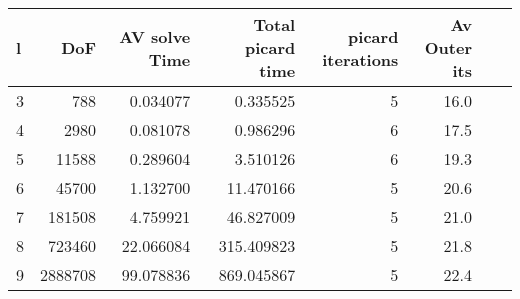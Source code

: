 \begin{tabular}{lrrrrrll}
\toprule
  l &      DoF &  AV solve Time &  Total picard time &  picard iterations & Av Outer its \\
\midrule
 3 &      788 &       0.034077 &     0.335525 &   5 & 16.0 \\
 4 &     2980 &       0.081078 &     0.986296 &   6 & 17.5 \\
 5 &    11588 &       0.289604 &     3.510126 &   6 & 19.3 \\
 6 &    45700 &       1.132700 &    11.470166 &   5 & 20.6 \\
 7 &   181508 &       4.759921 &    46.827009 &   5 & 21.0 \\
 8 &   723460 &      22.066084 &   315.409823 &   5 & 21.8 \\
 9 &  2888708 &      99.078836 &   869.045867 &   5 & 22.4 \\
\bottomrule
\end{tabular}
